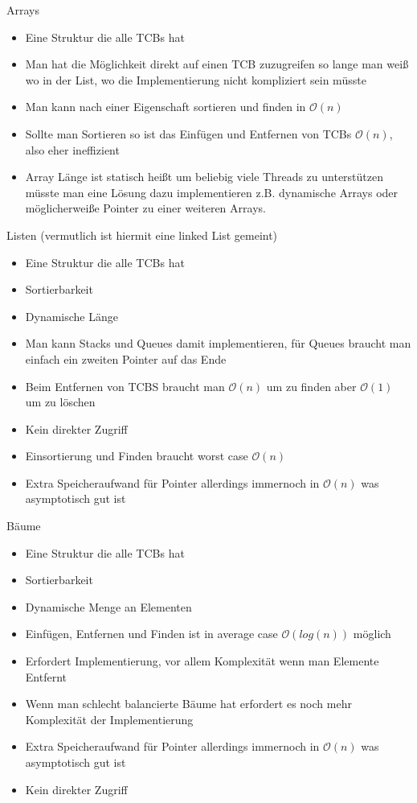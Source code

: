 \documentclass{article}
\begin{document}
Arrays
\begin{itemize}
\item[+] Eine Struktur die alle TCBs hat 
\item[+] Man hat die Möglichkeit direkt auf einen TCB zuzugreifen so lange man
	weiß wo in der List, wo die Implementierung nicht kompliziert sein
	müsste
\item[+] Man kann nach einer Eigenschaft sortieren und finden in $\mathcal{O}(n)$
\item[-] Sollte man Sortieren so ist das Einfügen und Entfernen von TCBs
	$\mathcal{O}(n)$, also eher ineffizient
\item[-] Array Länge ist statisch heißt um beliebig viele Threads zu
	unterstützen müsste man eine Lösung dazu implementieren z.B. dynamische
	Arrays oder möglicherweiße Pointer zu einer weiteren Arrays.
\end{itemize}

Listen (vermutlich ist hiermit eine linked List gemeint)
\begin{itemize}
\item[+] Eine Struktur die alle TCBs hat 
\item[+] Sortierbarkeit
\item[+] Dynamische Länge
\item[+] Man kann Stacks und Queues damit implementieren, für Queues braucht
	man einfach ein zweiten Pointer auf das Ende
\item[+-] Beim Entfernen von TCBS braucht man $\mathcal{O}(n)$ um zu finden aber
	$\mathcal{O}(1)$ um zu löschen
\item[-] Kein direkter Zugriff
\item[-] Einsortierung und Finden braucht worst case $\mathcal{O}(n)$
\item[-] Extra Speicheraufwand für Pointer allerdings immernoch in
	$\mathcal{O}(n)$ was asymptotisch gut ist
\end{itemize}

Bäume
\begin{itemize}
\item[+] Eine Struktur die alle TCBs hat 
\item[+] Sortierbarkeit
\item[+] Dynamische Menge an Elementen
\item[+] Einfügen, Entfernen und Finden ist in average case
	$\mathcal{O}(log(n))$ möglich
\item[-] Erfordert Implementierung, vor allem Komplexität wenn man Elemente
	Entfernt
\item[-] Wenn man schlecht balancierte Bäume hat erfordert es noch mehr
	Komplexität der Implementierung
\item[-] Extra Speicheraufwand für Pointer allerdings immernoch in
	$\mathcal{O}(n)$ was asymptotisch gut ist
\item[-] Kein direkter Zugriff
\end{itemize}
\end{document}
